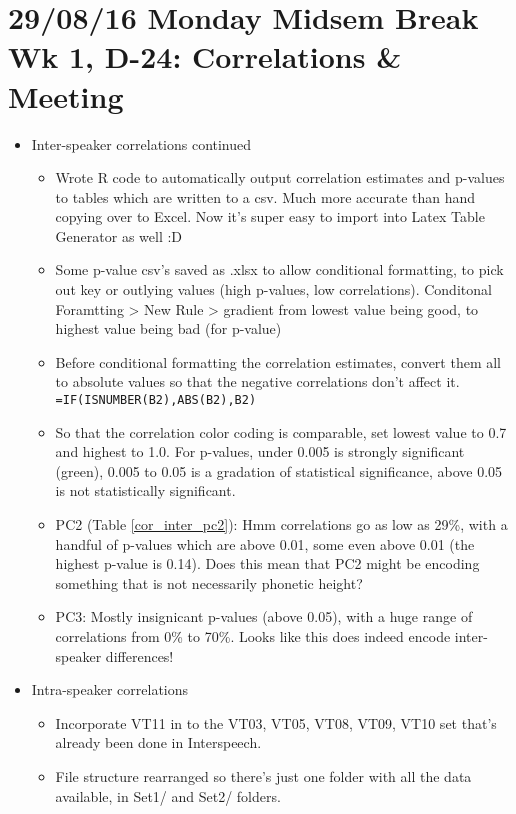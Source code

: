 \documentclass{article}
\begin{document}
\section*{29/08/16 Monday Midsem Break Wk 1, D-24: Correlations \& Meeting}
\begin{itemize}
    \item Inter-speaker correlations continued
    \begin{itemize}
        \item Wrote R code to automatically output correlation estimates and p-values to tables which are written to a csv. Much more accurate than hand copying over to Excel. Now it's super easy to import into Latex Table Generator as well :D
        \item Some p-value csv's saved as .xlsx to allow conditional formatting, to pick out key or outlying values (high p-values, low correlations). Conditonal Foramtting > New Rule > gradient from lowest value being good, to highest value being bad (for p-value)
        \item Before conditional formatting the correlation estimates, convert them all to absolute values so that the negative correlations don't affect it. 
        \verb|=IF(ISNUMBER(B2),ABS(B2),B2)|
        \item So that the correlation color coding is comparable, set lowest value to 0.7 and highest to 1.0. For p-values, under 0.005 is strongly significant (green), 0.005 to 0.05 is a gradation of statistical significance, above 0.05 is not statistically significant.
        \item PC2 (Table \ref{cor_inter_pc2}): Hmm correlations go as low as 29\%, with a handful of p-values which are above 0.01, some even above 0.01 (the highest p-value is 0.14). Does this mean that PC2 might be encoding something that is not necessarily phonetic height?
        \item PC3: Mostly insignicant p-values (above 0.05), with a huge range of correlations from 0\% to 70\%. Looks like this does indeed encode inter-speaker differences!
    \end{itemize}
    \item Intra-speaker correlations
    \begin{itemize}
        \item Incorporate VT11 in to the VT03, VT05, VT08, VT09, VT10 set that's already been done in Interspeech.
        \item File structure rearranged so there's just one folder with all the data available, in Set1/ and Set2/ folders.

\end{itemize}
\end{itemize}
\end{document}
